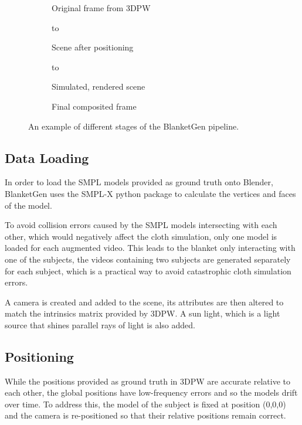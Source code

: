 \documentclass[conference]{IEEEtran}
\begin{document}
\begin{figure}[t]
\begin{subfigure}[t]{.49\linewidth}
  \centering
  \usebox{\mybox}
  \caption{Original frame from 3DPW}
  \label{fig:ogframe}
\end{subfigure}
\begin{subfigure}[t]{.49\linewidth}
  \centering
  \vbox to \ht{}
  \caption{Scene after positioning}
  \label{fig:pframe}
\end{subfigure}
\begin{subfigure}[t]{.49\linewidth}
  \centering
  \vbox to \ht{}
  \caption{Simulated, rendered scene}
  \label{fig:rframe}
\end{subfigure}
\begin{subfigure}[t]{.49\linewidth}
  \centering
  \usebox{\myboxtwo} 
  \caption{Final composited frame}
  \label{fig:fframe}
\end{subfigure}
\setlength{\belowcaptionskip}{-10pt}
\caption{An example of different stages of the BlanketGen pipeline.}
\label{fig:pipelineexample}
\end{figure}




\subsection{Data Loading}

In order to load the SMPL models provided as ground truth onto Blender, BlanketGen uses the SMPL-X \cite{SMPL-X} python package to calculate the vertices and faces of the model.

To avoid collision errors caused by the SMPL models intersecting with each other, which would negatively affect the cloth simulation, only one model is loaded for each augmented video. This leads to the blanket only interacting with one of the subjects, the videos containing two subjects are generated separately for each subject, which is a practical way to avoid catastrophic cloth simulation errors.

A camera is created and added to the scene, its attributes are then altered to match the intrinsics matrix provided by 3DPW.
A sun light, which is a light source that shines parallel rays of light is also added.


\subsection{Positioning}
While the positions provided as ground truth in 3DPW are accurate relative to each other, the global positions have low-frequency errors and so the models drift over time.
To address this, the model of the subject is fixed at position (0,0,0) and the camera is re-positioned so that their relative positions remain correct.
\end{document}
